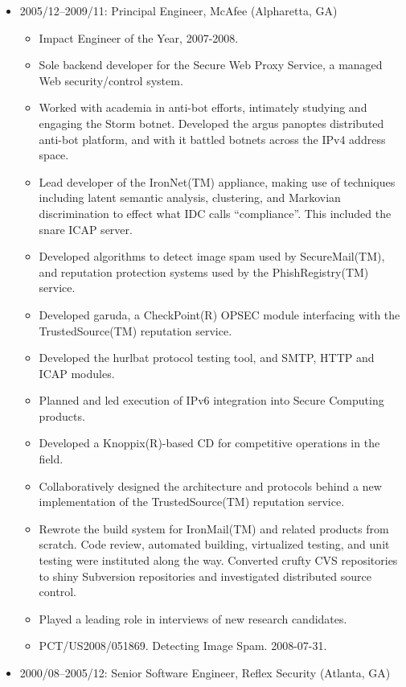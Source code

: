 \documentclass[11pt]{article}
\newenvironment{tightitemize}
{\begin{itemize}
  \setlength{\itemsep}{1pt}
  \setlength{\parskip}{0pt}
  \setlength{\parsep}{0pt}}
{\end{itemize}}
\begin{document}
\begin{tightitemize}
\item 2005/12--2009/11: Principal Engineer, McAfee (Alpharetta, GA)

\begin{tightitemize}
\item Impact Engineer of the Year, 2007-2008.
\item Sole backend developer for the Secure Web Proxy Service, a managed Web
  security/control system.
\item Worked with academia in anti-bot efforts, intimately studying and engaging
  the Storm botnet. Developed the argus panoptes distributed anti-bot
  platform, and with it battled botnets across the IPv4 address space.
\item Lead developer of the IronNet(TM) appliance, making use of techniques
  including latent semantic analysis, clustering, and Markovian discrimination
  to effect what IDC calls ``compliance''. This included the snare ICAP server.
\item Developed algorithms to detect image spam used by SecureMail(TM), and
  reputation protection systems used by the PhishRegistry(TM) service.
\item Developed garuda, a CheckPoint(R) OPSEC module interfacing with the
  TrustedSource(TM) reputation service.
\item Developed the hurlbat protocol testing tool, and SMTP, HTTP and ICAP modules.
\item Planned and led execution of IPv6 integration into Secure Computing products.
\item Developed a Knoppix(R)-based CD for competitive operations in the field.
\item Collaboratively designed the architecture and protocols behind a new
  implementation of the TrustedSource(TM) reputation service.
\item Rewrote the build system for IronMail(TM) and related products from scratch.
  Code review, automated building, virtualized testing, and unit testing were
  instituted along the way. Converted crufty CVS repositories to shiny
  Subversion repositories and investigated distributed source control.
\item Played a leading role in interviews of new research candidates.
\item PCT/US2008/051869. Detecting Image Spam. 2008-07-31.
\end{tightitemize}

\item 2000/08--2005/12: Senior Software Engineer, Reflex Security (Atlanta, GA)


\end{tightitemize}
\end{document}

